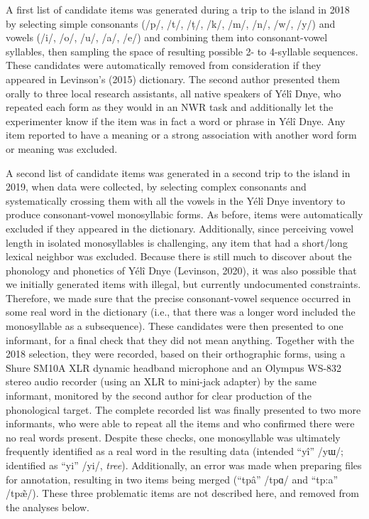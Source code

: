 \documentclass[english,,man,floatsintext]{apa6}
\begin{document}
A first list of candidate items was generated during a trip to the island in 2018 by selecting simple consonants (/p/, /t/, /ṭ/, /k/, /m/, /n/, /w/, /y/) and vowels (/i/, /o/, /u/, /a/, /e/) and combining them into consonant-vowel syllables, then sampling the space of resulting possible 2- to 4-syllable sequences. These candidates were automatically removed from consideration if they appeared in Levinson's (2015) dictionary. The second author presented them orally to three local research assistants, all native speakers of Yélî Dnye, who repeated each form as they would in an NWR task and additionally let the experimenter know if the item was in fact a word or phrase in Yélî Dnye. Any item reported to have a meaning or a strong association with another word form or meaning was excluded.

A second list of candidate items was generated in a second trip to the island in 2019, when data were collected, by selecting complex consonants and systematically crossing them with all the vowels in the Yélî Dnye inventory to produce consonant-vowel monosyllabic forms. As before, items were automatically excluded if they appeared in the dictionary. Additionally, since perceiving vowel length in isolated monosyllables is challenging, any item that had a short/long lexical neighbor was excluded. Because there is still much to discover about the phonology and phonetics of Yélî Dnye (Levinson, 2020), it was also possible that we initially generated items with illegal, but currently undocumented constraints. Therefore, we made sure that the precise consonant-vowel sequence occurred in some real word in the dictionary (i.e., that there was a longer word included the monosyllable as a subsequence). These candidates were then presented to one informant, for a final check that they did not mean anything. Together with the 2018 selection, they were recorded, based on their orthographic forms, using a Shure SM10A XLR dynamic headband microphone and an Olympus WS-832 stereo audio recorder (using an XLR to mini-jack adapter) by the same informant, monitored by the second author for clear production of the phonological target. The complete recorded list was finally presented to two more informants, who were able to repeat all the items and who confirmed there were no real words present. Despite these checks, one monosyllable was ultimately frequently identified as a real word in the resulting data (intended \enquote{yî} /yɯ/; identified as \enquote{yi} /yi/, \emph{tree}). Additionally, an error was made when preparing files for annotation, resulting in two items being merged (\enquote{tpâ} /tpɑ/ and \enquote{tp:a} /tpæ̃/). These three problematic items are not described here, and removed from the analyses below.
\end{document}
